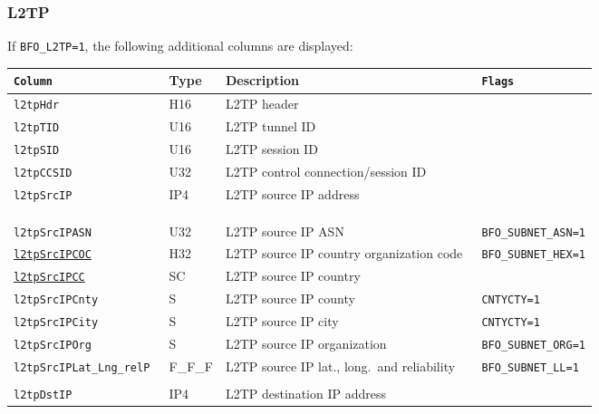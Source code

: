 \documentclass[documentation]{subfiles}
\begin{document}
\subsubsection{L2TP}\label{s:bfo:l2tp}

If {\tt BFO\_L2TP=1}, the following additional columns are displayed:

\begin{longtable}{>{\tt}lll>{\tt\small}l}
    \toprule
    {\bf Column}                    & {\bf Type} & {\bf Description}                           & {\bf Flags}\\
    \midrule\endhead%

    l2tpHdr                         & H16        & L2TP header                                 & \\
    l2tpTID                         & U16        & L2TP tunnel ID                              & \\
    l2tpSID                         & U16        & L2TP session ID                             & \\
    l2tpCCSID                       & U32        & L2TP control connection/session ID          & \\
    l2tpSrcIP                       & IP4        & L2TP source IP address                      & \\

    \\
    \multicolumn{4}{l}{If {\tt BFO\_SUBNET\_TEST\_L2TP=1}, the following columns are displayed:}\\
    \\

    l2tpSrcIPASN                    & U32        & L2TP source IP ASN                          & BFO\_SUBNET\_ASN=1\\
    \hyperref[subnet]{l2tpSrcIPCOC} & H32        & L2TP source IP country organization code    & BFO\_SUBNET\_HEX=1\\
    \hyperref[subnet]{l2tpSrcIPCC}  & SC         & L2TP source IP country                      & \\
    l2tpSrcIPCnty                   & S          & L2TP source IP county                       & CNTYCTY=1\\
    l2tpSrcIPCity                   & S          & L2TP source IP city                         & CNTYCTY=1\\
    l2tpSrcIPOrg                    & S          & L2TP source IP organization                 & BFO\_SUBNET\_ORG=1\\
    l2tpSrcIPLat\_Lng\_relP         & F\_F\_F    & L2TP source IP lat., long.\ and reliability & BFO\_SUBNET\_LL=1\\
    \\
    l2tpDstIP                       & IP4        & L2TP destination IP address                 & \\


\end{longtable}
\end{document}
